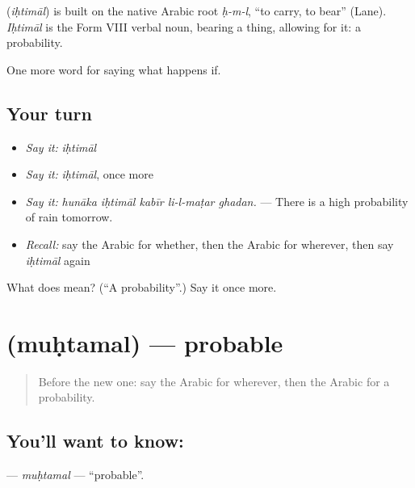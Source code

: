 \begin{cousinweb}
\textbf{} (\emph{iḥtimāl}) is built on the native Arabic root \emph{ḥ-m-l}, \textquotedblleft{}to carry, to bear\textquotedblright{} (Lane). \emph{Iḥtimāl} is the Form VIII verbal noun, bearing a thing, allowing for it: a probability.
\end{cousinweb}

\begin{grammarlens}[title={What you've built}]
One more word for saying what happens if.
\end{grammarlens}

\subsection*{Your turn}
\begin{itemize}
\raggedright
  \item \emph{Say it:} \emph{iḥtimāl}
  \item \emph{Say it:} \emph{iḥtimāl}, once more
  \item \emph{Say it:} \emph{hunāka iḥtimāl kabīr li-l-maṭar ghadan.} — There is a high probability of rain tomorrow.
  \item \emph{Recall:} say the Arabic for whether, then the Arabic for wherever, then say \emph{iḥtimāl} again
\end{itemize}

\begin{tcolorbox}[breakable,colback=teal!4,colframe=teal!35!black,title={Before you move on}]
What does  mean? (\textquotedblleft{}A probability\textquotedblright{}.) Say it once more.
\end{tcolorbox}
\section[\texorpdfstring{\ar{محتمل} (muḥtamal)}{محتمل (muḥtamal)}]{ (muḥtamal) — probable}

\label{lesson:AR-C401-muhtamal}



\begin{quote}
Before the new one: say the Arabic for wherever, then the Arabic for a probability.
\end{quote}

\subsection*{You'll want to know: }
\textbf{} — \emph{muḥtamal} — \textquotedblleft{}probable\textquotedblright{}.

